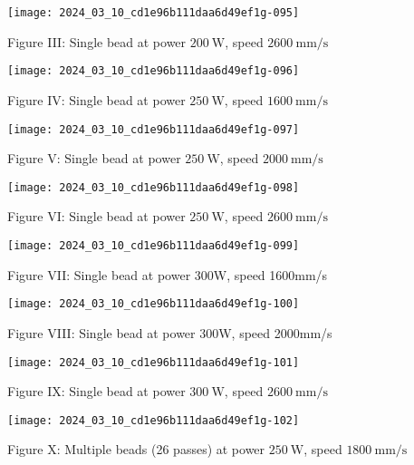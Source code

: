 \documentclass[10pt]{article}
\begin{document}
\begin{center}
\texttt{[image: 2024\_03\_10\_cd1e96b111daa6d49ef1g-095]}
\end{center}

Figure III: Single bead at power $200 \mathrm{~W}$, speed $2600 \mathrm{~mm} / \mathrm{s}$

\begin{center}
\texttt{[image: 2024\_03\_10\_cd1e96b111daa6d49ef1g-096]}
\end{center}

Figure IV: Single bead at power $250 \mathrm{~W}$, speed $1600 \mathrm{~mm} / \mathrm{s}$

\begin{center}
\texttt{[image: 2024\_03\_10\_cd1e96b111daa6d49ef1g-097]}
\end{center}

Figure V: Single bead at power $250 \mathrm{~W}$, speed $2000 \mathrm{~mm} / \mathrm{s}$

\begin{center}
\texttt{[image: 2024\_03\_10\_cd1e96b111daa6d49ef1g-098]}
\end{center}

Figure VI: Single bead at power $250 \mathrm{~W}$, speed $2600 \mathrm{~mm} / \mathrm{s}$

\begin{center}
\texttt{[image: 2024\_03\_10\_cd1e96b111daa6d49ef1g-099]}
\end{center}

Figure VII: Single bead at power 300W, speed 1600mm/s

\begin{center}
\texttt{[image: 2024\_03\_10\_cd1e96b111daa6d49ef1g-100]}
\end{center}

Figure VIII: Single bead at power 300W, speed 2000mm/s

\begin{center}
\texttt{[image: 2024\_03\_10\_cd1e96b111daa6d49ef1g-101]}
\end{center}

Figure IX: Single bead at power $300 \mathrm{~W}$, speed $2600 \mathrm{~mm} / \mathrm{s}$

\begin{center}
\texttt{[image: 2024\_03\_10\_cd1e96b111daa6d49ef1g-102]}
\end{center}

Figure X: Multiple beads (26 passes) at power $250 \mathrm{~W}$, speed $1800 \mathrm{~mm} / \mathrm{s}$
\end{document}
